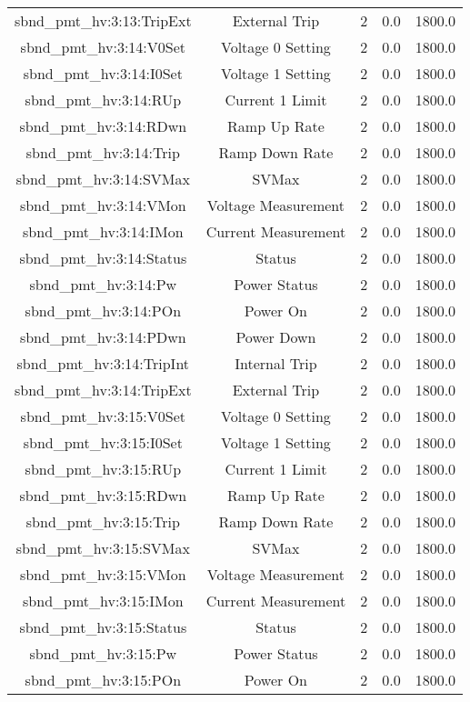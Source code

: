\begin{center}
\begin{longtable}{c | c c c c }
sbnd\_pmt\_hv:3:13:TripExt & External Trip & 2 & 0.0 & 1800.0\\ 
sbnd\_pmt\_hv:3:14:V0Set & Voltage 0 Setting & 2 & 0.0 & 1800.0\\ 
sbnd\_pmt\_hv:3:14:I0Set & Voltage 1 Setting & 2 & 0.0 & 1800.0\\ 
sbnd\_pmt\_hv:3:14:RUp & Current 1 Limit & 2 & 0.0 & 1800.0\\ 
sbnd\_pmt\_hv:3:14:RDwn & Ramp Up Rate & 2 & 0.0 & 1800.0\\ 
sbnd\_pmt\_hv:3:14:Trip & Ramp Down Rate & 2 & 0.0 & 1800.0\\ 
sbnd\_pmt\_hv:3:14:SVMax & SVMax & 2 & 0.0 & 1800.0\\ 
sbnd\_pmt\_hv:3:14:VMon & Voltage Measurement & 2 & 0.0 & 1800.0\\ 
sbnd\_pmt\_hv:3:14:IMon & Current Measurement & 2 & 0.0 & 1800.0\\ 
sbnd\_pmt\_hv:3:14:Status & Status & 2 & 0.0 & 1800.0\\ 
sbnd\_pmt\_hv:3:14:Pw & Power Status & 2 & 0.0 & 1800.0\\ 
sbnd\_pmt\_hv:3:14:POn & Power On & 2 & 0.0 & 1800.0\\ 
sbnd\_pmt\_hv:3:14:PDwn & Power Down & 2 & 0.0 & 1800.0\\ 
sbnd\_pmt\_hv:3:14:TripInt & Internal Trip & 2 & 0.0 & 1800.0\\ 
sbnd\_pmt\_hv:3:14:TripExt & External Trip & 2 & 0.0 & 1800.0\\ 
sbnd\_pmt\_hv:3:15:V0Set & Voltage 0 Setting & 2 & 0.0 & 1800.0\\ 
sbnd\_pmt\_hv:3:15:I0Set & Voltage 1 Setting & 2 & 0.0 & 1800.0\\ 
sbnd\_pmt\_hv:3:15:RUp & Current 1 Limit & 2 & 0.0 & 1800.0\\ 
sbnd\_pmt\_hv:3:15:RDwn & Ramp Up Rate & 2 & 0.0 & 1800.0\\ 
sbnd\_pmt\_hv:3:15:Trip & Ramp Down Rate & 2 & 0.0 & 1800.0\\ 
sbnd\_pmt\_hv:3:15:SVMax & SVMax & 2 & 0.0 & 1800.0\\ 
sbnd\_pmt\_hv:3:15:VMon & Voltage Measurement & 2 & 0.0 & 1800.0\\ 
sbnd\_pmt\_hv:3:15:IMon & Current Measurement & 2 & 0.0 & 1800.0\\ 
sbnd\_pmt\_hv:3:15:Status & Status & 2 & 0.0 & 1800.0\\ 
sbnd\_pmt\_hv:3:15:Pw & Power Status & 2 & 0.0 & 1800.0\\ 
sbnd\_pmt\_hv:3:15:POn & Power On & 2 & 0.0 & 1800.0\\ 

\end{longtable}
\end{center}
